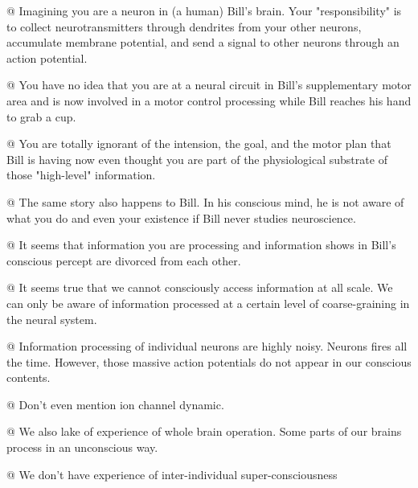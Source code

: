 \documentclass[utf8]{article}
\newenvironment{ants}
			{
			 \begin{easylist}[itemize]
			}
			{
			\end{easylist}
			}
\begin{document}
		\begin{ants}
			
				@ Imagining you are a neuron in (a human) Bill's brain. Your "responsibility" is to collect neurotransmitters through dendrites from your other neurons, accumulate membrane potential, and send a signal to other neurons through an action potential. 
				
				@ You have no idea that you are at a neural circuit in Bill's supplementary motor area and is now involved in a motor control processing while Bill reaches his hand to grab a cup. 
				
				@  You are totally ignorant of the intension, the goal, and the motor plan that Bill is having now even thought you are part of the physiological substrate of those "high-level" information. 
				
				@ The same story also happens to Bill. In his conscious mind, he is not aware of what you do and even your existence if Bill never studies neuroscience.
				
				@ It seems that information you are processing and information shows in Bill's conscious percept are divorced from each other. 
				
				
				
				
				
%			
			
			
				
				@ It seems true that we cannot consciously access information at all scale. We can only be aware of information processed at a certain level of coarse-graining in the neural system.
				
				
				@ Information processing of individual neurons are highly noisy. Neurons fires all the time. However, those massive action potentials do not appear in our conscious contents. 
				
				@ Don't even mention ion channel dynamic. 
			
				@ We also lake of experience of whole brain operation. Some parts of our brains process in an unconscious way.
			
				@ We don't have experience of inter-individual super-consciousness 


\end{ants}
\end{document}
